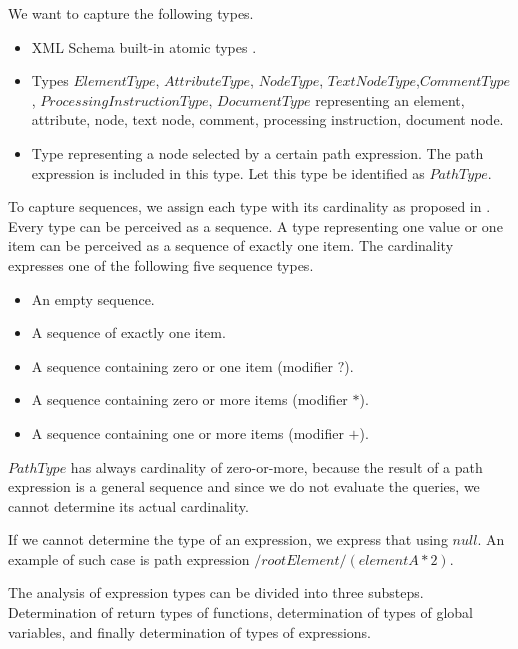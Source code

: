 We want to capture the following types.

\begin{itemize}
\item XML Schema built-in atomic types .
\item Types $ElementType$, $AttributeType$, $NodeType$, $TextNodeType$,\linebreak $CommentType$, $ProcessingInstructionType$, $DocumentType$ representing an element, attribute, node, text node, comment, processing instruction, document node.
\item Type representing a node selected by a certain path expression. The path expression is included in this type. Let this type be identified as $PathType$.
\end{itemize}

To capture sequences, we assign each type with its cardinality as proposed in . Every type can be perceived as a sequence. A type representing one value or one item can be perceived as a sequence of exactly one item. The cardinality expresses one of the following five sequence types.

\begin{itemize}
\item An empty sequence.
\item A sequence of exactly one item.
\item A sequence containing zero or one item (modifier $?$).
\item A sequence containing zero or more items (modifier $*$).
\item A sequence containing one or more items (modifier $+$).
\end{itemize}

$PathType$ has always cardinality of zero-or-more, because the result of a path expression is a general sequence and since we do not evaluate the queries, we cannot determine its actual cardinality.

If we cannot determine the type of an expression, we express that using $null$. An example of such case is path expression $/rootElement/(elementA * 2)$. 

The analysis of expression types can be divided into three substeps. Determination of return types of functions, determination of types of global variables, and finally determination of types of expressions.


